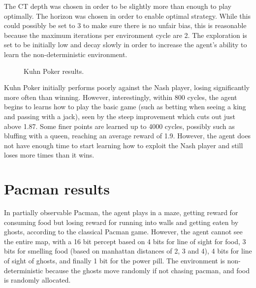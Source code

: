 \documentclass[pdftex,twoside,a4paper]{report}
\begin{document}
The CT depth was chosen in order to be slightly more than enough to play optimally. The horizon was chosen in order to enable optimal strategy. While this could possibly be set to 3 to make sure there is no unfair bias, this is reasonable because the maximum iterations per environment cycle are 2. The exploration is set to be initially low and decay slowly in order to increase the agent's ability to learn the non-deterministic environment.

\begin{figure}[h]
  \begin{center}
  \end{center}
  \caption{Kuhn Poker results.}
  \label{fig:kuhn_results}
\end{figure}

Kuhn Poker initially performs poorly against the Nash player, losing significantly more often than winning. However, interestingly, within 800 cycles, the agent begins to learns how to play the basic game (such as betting when seeing a king and passing with a jack), seen by the steep improvement which cuts out just above 1.87. Some finer points are learned up to 4000 cycles, possibly such as bluffing with a queen, reaching an average reward of 1.9. However, the agent does not have enough time to start learning how to exploit the Nash player and still loses more times than it wins.

\section{Pacman results}

In partially observable Pacman, the agent plays in a maze, getting reward for consuming food but losing reward for running into walls and getting eaten by ghosts, according to the classical Pacman game. However, the agent cannot see the entire map, with a 16 bit percept based on 4 bits for line of sight for food, 3  bits for smelling food (based on manhattan distances of 2, 3 and 4), 4 bits for line of sight of ghosts, and finally 1 bit for the power pill. The environment is non-deterministic because the ghosts move randomly if not chasing pacman, and food is randomly allocated.
\end{document}
